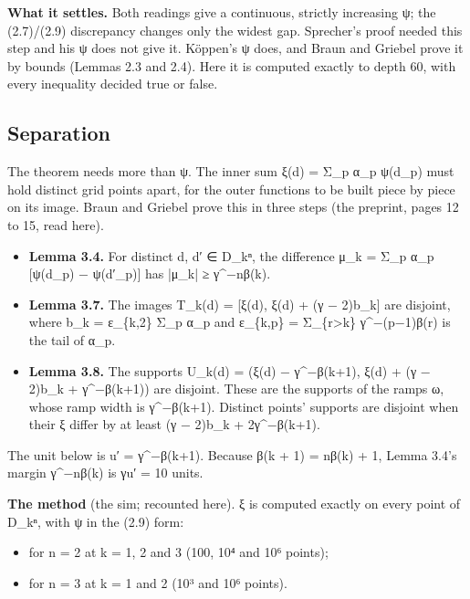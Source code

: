 \textbf{What it settles.} Both readings give a continuous, strictly increasing ψ; the (2.7)/(2.9) discrepancy changes only the widest gap. Sprecher's proof needed this step and his ψ does not give it. Köppen's ψ does, and Braun and Griebel prove it by bounds (Lemmas 2.3 and 2.4). Here it is computed exactly to depth 60, with every inequality decided true or false.

\subsection{\texorpdfstring{Separation}{Separation}}

The theorem needs more than ψ. The inner sum ξ(d) = Σ\_\allowbreak{}p α\_\allowbreak{}p ψ(d\_\allowbreak{}p) must hold distinct grid points apart, for the outer functions to be built piece by piece on its image. Braun and Griebel prove this in three steps (the preprint, pages 12 to 15, read here).

\begin{itemize}
\item \textbf{Lemma 3.4.} For distinct d, d′ ∈ D\_\allowbreak{}kⁿ, the difference μ\_\allowbreak{}k = Σ\_\allowbreak{}p α\_\allowbreak{}p [ψ(d\_\allowbreak{}p) − ψ(d′\_\allowbreak{}p)] has |μ\_\allowbreak{}k| ≥ γ\textasciicircum{}−nβ(k).
\item \textbf{Lemma 3.7.} The images T\_\allowbreak{}k(d) = [ξ(d), ξ(d) + (γ − 2)b\_\allowbreak{}k] are disjoint, where b\_\allowbreak{}k = ε\_\allowbreak{}\{k,2\} Σ\_\allowbreak{}p α\_\allowbreak{}p and ε\_\allowbreak{}\{k,p\} = Σ\_\allowbreak{}\{r>k\} γ\textasciicircum{}−(p−1)β(r) is the tail of α\_\allowbreak{}p.
\item \textbf{Lemma 3.8.} The supports U\_\allowbreak{}k(d) = (ξ(d) − γ\textasciicircum{}−β(k+1), ξ(d) + (γ − 2)b\_\allowbreak{}k + γ\textasciicircum{}−β(k+1)) are disjoint. These are the supports of the ramps ω, whose ramp width is γ\textasciicircum{}−β(k+1). Distinct points' supports are disjoint when their ξ differ by at least (γ − 2)b\_\allowbreak{}k + 2γ\textasciicircum{}−β(k+1).
\end{itemize}

The unit below is u′ = γ\textasciicircum{}−β(k+1). Because β(k + 1) = nβ(k) + 1, Lemma 3.4's margin γ\textasciicircum{}−nβ(k) is γu′ = 10 units.

\textbf{The method} (the sim; recounted here). ξ is computed exactly on every point of D\_\allowbreak{}kⁿ, with ψ in the (2.9) form:

\begin{itemize}
\item for n = 2 at k = 1, 2 and 3 (100, 10⁴ and 10⁶ points);
\item for n = 3 at k = 1 and 2 (10³ and 10⁶ points).
\end{itemize}

